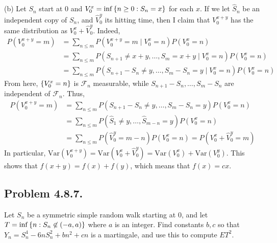 \documentclass[12pt]{article}
\theoremstyle{definitionstyle}
\newcommand{\SET}[1]{\Set{\mskip-\medmuskip #1 \mskip-\medmuskip}}
\newcommand{\1}{\mathds 1}
\newcommand{\Var}{\mathrm{Var}}
\begin{document}
    (b) Let $S_n$ start at 0 and $V_0^x = \inf \SET{n \geq 0 : S_n = x}$ for each $x$. If we let $\hat S_n$ be an independent copy of $S_n$, and $\hat V_0^{y}$ its hitting time, then I claim that $V_0^{x+y}$ has the same distribution as $V_0^x + \hat V_0^{y}$. Indeed,
    \begin{align*}
        P(V_0^{x+y} = m) &= \sum_{n \leq m} P(V_0^{x+y} = m \mid V_0^x = n) P(V_0^x = n) \\
        &= \sum_{n \leq m} P(S_{n+1} \neq x+y, \ldots, S_m = x+y \mid V_0^x = n)P(V_0^x = n) \\
        &= \sum_{n \leq m} P(S_{n+1} - S_n \neq y, \ldots, S_m - S_n = y \mid V_0^x = n)P(V_0^x = n)
    \end{align*}
    From here, $\SET{V_0^x = n}$ is $\mathcal F_n$ measurable, while $S_{n+1} - S_n, \ldots, S_m - S_n$ are independent of $\mathcal F_n$. Thus,
    \begin{align*}
        P(V_0^{x+y} = m) &= \sum_{n \leq m} P(S_{n+1} - S_n \neq y, \ldots, S_m - S_n = y)P(V_0^x = n) \\
        &= \sum_{n \leq m} P(\hat S_1 \neq y, \ldots, \hat S_{m-n} = y)P(V_0^x = n) \\
        &= \sum_{n \leq m} P(\hat V_0^y = m-n)P(V_0^x = n) = P(V_0^x + \hat V_0^y = m)
    \end{align*}
    In particular, $\Var(V^{x+y}_0) = \Var(V_0^x + \hat V_0^y) = \Var(V_0^x) + \Var(V_0^y)$. This shows that $f(x+y) = f(x) + f(y)$, which means that $f(x) = cx$.

    \subsection*{Problem 4.8.7.}
    Let $S_n$ be a symmetric simple random walk starting at 0, and let $T = \inf\SET{n : S_n \not \in (-a,a)}$ where $a$ is an integer. Find constants $b,c$ so that $Y_n = S_n^4 - 6nS_n^2 + bn^2 + cn$ is a martingale, and use this to compute $ET^2$.
\end{document}
